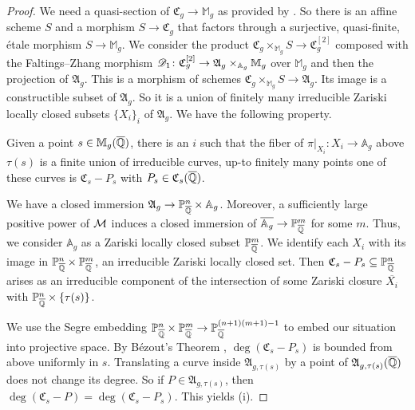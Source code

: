 \begin{proof}
  We need a quasi-section of
  $\mathfrak{C}_g\rightarrow\mathbb{M}_g$ as provided by \cite[Corollaire~17.16.3(ii)]{EGAIV}. 
  So there is an affine scheme $S$
  and a morphism $S\rightarrow \mathfrak{C}_g$ that factors through a
  surjective, quasi-finite, \'etale morphism $ S\rightarrow
  \mathbb{M}_g$. We consider the product
  $\mathfrak{C}_g\times_{\mathbb{M}_g} S\rightarrow
  \mathfrak{C}_g^{[2]}$ composed with the Faltings--Zhang morphism
  $\mathscr{D}_1\colon
  \mathfrak{C}_g^{[2]}\rightarrow\mathfrak{A}_g\times_{{\mathbb{A}}_g}
  \mathbb{M}_g$ over $\mathbb{M}_g$ and then the projection of
  $\mathfrak{A}_g$. This is a morphism of schemes
  $\mathfrak{C}_g\times_{\mathbb{M}_g} S\rightarrow
  \mathfrak{A}_g$. Its 
  image is a constructible subset of $\mathfrak{A}_g$. 
  So it is a union of finitely many 
  irreducible Zariski locally closed subsets $\{X_i\}_i$ of
  $\mathfrak{A}_g$. We have
  the following property. %

  Given a point $s\in \mathbb{M}_g({\overline{\mathbb{Q}}})$, there is an $i$ such that
  the fiber of $\pi|_{X_i}\colon X_i \rightarrow\mathbb{A}_g$ above
  $\tau(s)$ is a finite union of irreducible curves, up-to finitely
  many points one of these curves is
  $\mathfrak{C}_s-P_s$ with $P_s\in \mathfrak{C}_s({\overline{\mathbb{Q}}})$.
  
  
  We  have a closed immersion $\mathfrak{A}_g\rightarrow {\mathbb{P}}_{\overline{\mathbb{Q}}}^n
  \times \mathbb{A}_g$.
  Moreover, a sufficiently  large positive power of ${\mathcal M}$ induces a
  closed immersion of $\overline{\mathbb{A}_g}\rightarrow{\mathbb{P}}_{\overline{\mathbb{Q}}}^m$
   for some $m$.
  Thus, we consider $\mathbb{A}_g$ as a 
  Zariski locally closed subset
  ${\mathbb{P}}_{\overline{\mathbb{Q}}}^m$. We identify each 
  $X_i$ with its image in ${\mathbb{P}}^n_{\overline{\mathbb{Q}}}\times
  {\mathbb{P}}^m_{\overline{\mathbb{Q}}}$, an irreducible  Zariski locally closed set.  Then
  $\mathfrak{C}_s-P_s \subseteq{\mathbb{P}}^n_{\overline{\mathbb{Q}}}$ arises as an irreducible
  component of the intersection of some Zariski
  closure $\overline{X_i}$
   with ${\mathbb{P}}^n_{\overline{\mathbb{Q}}}\times
  \{\tau(s)\}$.

  We use the Segre embedding
  ${\mathbb{P}}_{\overline{\mathbb{Q}}}^n\times{\mathbb{P}}_{\overline{\mathbb{Q}}}^m\rightarrow {\mathbb{P}}_{\overline{\mathbb{Q}}}^{(n+1)(m+1)-1}$
  to embed our situation into projective space. By B\'ezout's Theorem
  \cite[Example~8.4.6]{Fulton},
  $\deg(\mathfrak{C}_s-P_s)$ is bounded from above uniformly in $s$.
  Translating a curve inside $\mathfrak{A}_{g,\tau(s)}$ by a point of
  $\mathfrak{A}_{g,\tau(s)}({\overline{\mathbb{Q}}})$ does not
  change its degree. So if $P\in \mathfrak{A}_{g,\tau(s)}$, then
  $\deg(\mathfrak{C}_s-P)=\deg(\mathfrak{C}_s-P_s)$.  
  This yields (i).


\end{proof}
